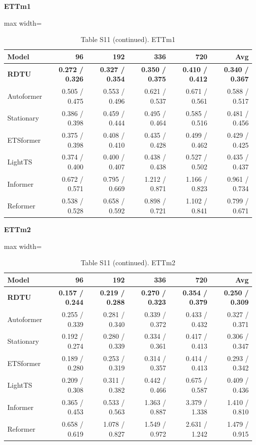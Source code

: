 \begin{table}[H]\centering\small
\caption*{Table S11 (continued). ETTm1}
\textbf{ETTm1}\par\smallskip
\begin{adjustbox}{max width=\linewidth}\begin{tabular}{lrrrrr}\toprule
\textbf{Model} & \textbf{96} & \textbf{192} & \textbf{336} & \textbf{720} & \textbf{Avg}\\\midrule
\rowcolor{blue!5}
\textbf{RDTU} & \textbf{0.272 / 0.326} & \textbf{0.327 / 0.354} & \textbf{0.350 / 0.375} & \textbf{0.410 / 0.412} & \textbf{0.340 / 0.367}\\
Autoformer & 0.505 / 0.475 & 0.553 / 0.496 & 0.621 / 0.537 & 0.671 / 0.561 & 0.588 / 0.517\\
Stationary & 0.386 / 0.398 & 0.459 / 0.444 & 0.495 / 0.464 & 0.585 / 0.516 & 0.481 / 0.456\\
ETSformer & 0.375 / 0.398 & 0.408 / 0.410 & 0.435 / 0.428 & 0.499 / 0.462 & 0.429 / 0.425\\
LightTS & 0.374 / 0.400 & 0.400 / 0.407 & 0.438 / 0.438 & 0.527 / 0.502 & 0.435 / 0.437\\
Informer & 0.672 / 0.571 & 0.795 / 0.669 & 1.212 / 0.871 & 1.166 / 0.823 & 0.961 / 0.734\\
Reformer & 0.538 / 0.528 & 0.658 / 0.592 & 0.898 / 0.721 & 1.102 / 0.841 & 0.799 / 0.671\\
\bottomrule\end{tabular}\end{adjustbox}\end{table}
\begin{table}[H]\centering\small
\caption*{Table S11 (continued). ETTm2}
\textbf{ETTm2}\par\smallskip
\begin{adjustbox}{max width=\linewidth}\begin{tabular}{lrrrrr}\toprule
\textbf{Model} & \textbf{96} & \textbf{192} & \textbf{336} & \textbf{720} & \textbf{Avg}\\\midrule
\rowcolor{blue!5}
\textbf{RDTU} & \textbf{0.157 / 0.244} & \textbf{0.219 / 0.288} & \textbf{0.270 / 0.323} & \textbf{0.354 / 0.379} & \textbf{0.250 / 0.309}\\
Autoformer & 0.255 / 0.339 & 0.281 / 0.340 & 0.339 / 0.372 & 0.433 / 0.432 & 0.327 / 0.371\\
Stationary & 0.192 / 0.274 & 0.280 / 0.339 & 0.334 / 0.361 & 0.417 / 0.413 & 0.306 / 0.347\\
ETSformer & 0.189 / 0.280 & 0.253 / 0.319 & 0.314 / 0.357 & 0.414 / 0.413 & 0.293 / 0.342\\
LightTS & 0.209 / 0.308 & 0.311 / 0.382 & 0.442 / 0.466 & 0.675 / 0.587 & 0.409 / 0.436\\
Informer & 0.365 / 0.453 & 0.533 / 0.563 & 1.363 / 0.887 & 3.379 / 1.338 & 1.410 / 0.810\\
Reformer & 0.658 / 0.619 & 1.078 / 0.827 & 1.549 / 0.972 & 2.631 / 1.242 & 1.479 / 0.915\\
\bottomrule\end{tabular}\end{adjustbox}\end{table}
